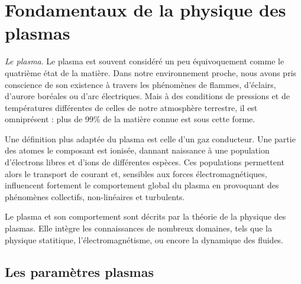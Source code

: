 	\section{Fondamentaux de la physique des plasmas}
		 
		\emph{Le plasma}. Le plasma est souvent considéré un peu équivoquement
		comme le quatrième état de la matière. Dans notre environnement proche,
		nous avons pris conscience de son existence à travers les phénomènes de flammes,
		d'éclairs, d'aurore boréales ou d'arc électriques. Mais à des conditions de
		pressions et de températures différentes de celles de notre atmosphère
		terrestre, il est omniprésent : plus de 99\% de la matière connue est sous
		cette forme. 
		
		Une définition plus adaptée du plasma est celle d'un gaz conducteur. Une partie des
		atomes le composant est ionisée, dannant naissance à une population
		d'électrons libres et d'ions de différentes espèces. Ces populations permettent alors
		le transport de courant et, sensibles aux forces électromagnétiques, influencent
		fortement le comportement global du plasma en provoquant des phénomènes
		collectifs, non-linéaires et turbulents.
		
		Le plasma et son comportement sont décrits par la théorie de la physique des
		plasmas. Elle intègre les connaissances de nombreux domaines, tels que la
		physique statitique, l'électromagnétisme, ou encore la dynamique des fluides.
		
		\subsection{Les paramètres plasmas}
		
